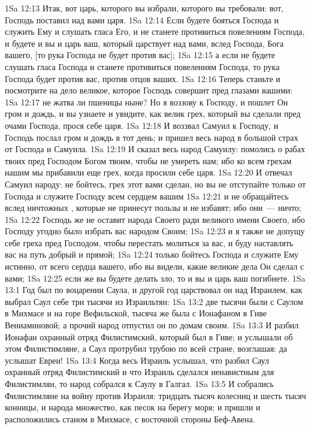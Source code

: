 \vs 1Sa 12:13 Итак, вот царь, которого вы избрали, которого вы требовали: вот, Господь поставил над вами царя.
\vs 1Sa 12:14 Если будете бояться Господа и служить Ему и слушать гласа Его, и не станете противиться повелениям Господа, и будете и вы и царь ваш, который царствует над вами,  вслед Господа, Бога вашего, [то рука Господа не будет против вас];
\vs 1Sa 12:15 а если не будете слушать гласа Господа и станете противиться повелениям Господа, то рука Господа будет против вас,  против отцов ваших.
\vs 1Sa 12:16 Теперь станьте и посмотрите на дело великое, которое Господь совершит пред глазами вашими:
\vs 1Sa 12:17 не жатва ли пшеницы ныне? Но я воззову к Господу, и пошлет Он гром и дождь, и вы узнаете и увидите, как велик грех, который вы сделали пред очами Господа, прося себе царя.
\vs 1Sa 12:18 И воззвал Самуил к Господу, и Господь послал гром и дождь в тот день; и пришел весь народ в большой страх от Господа и Самуила.
\vs 1Sa 12:19 И сказал весь народ Самуилу: помолись о рабах твоих пред Господом Богом твоим, чтобы не умереть нам; ибо ко всем грехам нашим мы прибавили еще грех, когда просили себе царя.
\vs 1Sa 12:20 И отвечал Самуил народу: не бойтесь, грех этот вами сделан, но вы не отступайте только от Господа и служите Господу всем сердцем вашим
\vs 1Sa 12:21 и не обращайтесь вслед ничтожных , которые не принесут пользы и не избавят; ибо они~--- ничто;
\vs 1Sa 12:22 Господь же не оставит народа Своего ради великого имени Своего, ибо Господу угодно было избрать вас народом Своим;
\vs 1Sa 12:23 и я также не допущу себе греха пред Господом, чтобы перестать молиться за вас, и буду наставлять вас на путь добрый и прямой;
\vs 1Sa 12:24 только бойтесь Господа и служите Ему истинно, от всего сердца вашего, ибо вы видели, какие великие дела Он сделал с вами;
\vs 1Sa 12:25 если же вы будете делать зло, то и вы и царь ваш погибнете.
\vs 1Sa 13:1 Год был по воцарении Саула, и другой год царствовал он над Израилем, как выбрал Саул себе три тысячи из Израильтян:
\vs 1Sa 13:2 две тысячи были с Саулом в Михмасе и на горе Вефильской, тысяча же была с Ионафаном в Гиве Вениаминовой; а прочий народ отпустил он по домам своим.
\vs 1Sa 13:3 И разбил Ионафан охранный отряд Филистимский, который был в Гиве; и услышали об этом Филистимляне, а Саул протрубил трубою по всей стране, возглашая: да услышат Евреи!
\vs 1Sa 13:4 Когда весь Израиль услышал, что разбил Саул охранный отряд Филистимский и что Израиль сделался ненавистным для Филистимлян, то народ собрался к Саулу в Галгал.
\vs 1Sa 13:5 И собрались Филистимляне на войну против Израиля: тридцать тысяч колесниц и шесть тысяч конницы, и народа множество, как песок на берегу моря; и пришли и расположились станом в Михмасе, с восточной стороны Беф-Авена.
